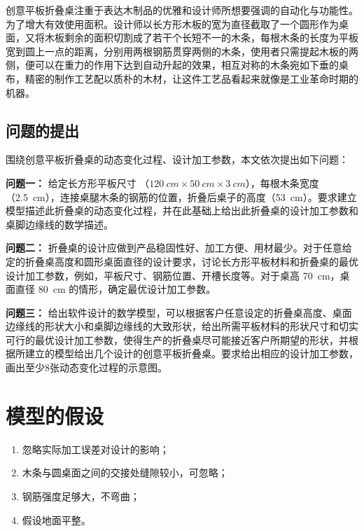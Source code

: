 \documentclass[bwprint]{gmcmthesis}
\begin{document}
创意平板折叠桌注重于表达木制品的优雅和设计师所想要强调的自动化与功能性。为了增大有效使用面积。设计师以长方形木板的宽为直径截取了一个圆形作为桌面，又将木板剩余的面积切割成了若干个长短不一的木条，每根木条的长度为平板宽到圆上一点的距离，分别用两根钢筋贯穿两侧的木条，使用者只需提起木板的两侧，便可以在重力的作用下达到自动升起的效果，相互对称的木条宛如下垂的桌布，精密的制作工艺配以质朴的木材，让这件工艺品看起来就像是工业革命时期的机器。


\subsection{问题的提出}


\noindent 围绕创意平板折叠桌的动态变化过程、设计加工参数，本文依次提出如下问题：

\textbf{问题一：} 给定长方形平板尺寸 （$\SI{120}{cm} \times \SI{50}{cm} \times \SI{3}{cm}$），每根木条宽度（\SI{2.5}{cm}），连接桌腿木条的钢筋的位置，折叠后桌子的高度（\SI{53}{cm}）。要求建立模型描述此折叠桌的动态变化过程，并在此基础上给出此折叠桌的设计加工参数和桌脚边缘线的数学描述。


\textbf{问题二：} 折叠桌的设计应做到产品稳固性好、加工方便、用材最少。对于任意给定的折叠桌高度和圆形桌面直径的设计要求，讨论长方形平板材料和折叠桌的最优设计加工参数，例如，平板尺寸、钢筋位置、开槽长度等。对于桌高 \SI{70}{cm}，桌面直径 \SI{80}{cm} 的情形，确定最优设计加工参数。


\textbf{问题三：} 给出软件设计的数学模型，可以根据客户任意设定的折叠桌高度、桌面边缘线的形状大小和桌脚边缘线的大致形状，给出所需平板材料的形状尺寸和切实可行的最优设计加工参数，使得生产的折叠桌尽可能接近客户所期望的形状，并根据所建立的模型给出几个设计的创意平板折叠桌。要求给出相应的设计加工参数，画出至少8张动态变化过程的示意图。



\clearpage
\section{模型的假设}

\begin{enumerate}
\item 忽略实际加工误差对设计的影响；
\item 木条与圆桌面之间的交接处缝隙较小，可忽略；
\item 钢筋强度足够大，不弯曲；
\item 假设地面平整。
\end{enumerate}
\end{document}
